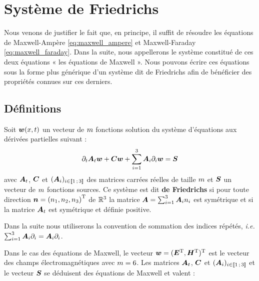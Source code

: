 \section{Système de Friedrichs}
\label{sect:systeme_de_friedrichs}

Nous venons de justifier le fait que, en principe, il suffit de résoudre
les équations de Maxwell-Ampère \eqref{eq:maxwell_ampere} et Maxwell-Faraday
\eqref{eq:maxwell_faraday}.
Dans la suite, nous appellerons le système constitué de ces deux équations
« les équations de Maxwell ». Nous pouvons écrire ces équations sous la forme
plus générique d'un système dit de Friedrichs \cite{friedrichs_definition, friedrichs_courant, friedrichs_ern} afin de bénéficier
des propriétés connues sur ces derniers.
\\

\subsection{Définitions}
\label{ssect:systeme_de_friedrichs_definitions}

\begin{definition} \label{def:friedrichs}
	Soit $\bm{w}(x,t)$ un vecteur
	de $m$ fonctions solution du système d'équations aux dérivées
	partielles suivant :
	\begin{align}
		\partial_{t} \bm{A}_{t} \bm{w} + \bm{C} \bm{w} + \sum_{i=1}^3 {\bm{A}_{i}\partial_{i}} \bm{w} = \bm{S}
		\label{eq:friedrichs}
	\end{align}
	avec $\bm{A}_{t}$, $\bm{C}$ et $(\bm{A}_{i})_{i \in \lbrack\!\lbrack1\,;\,3\rbrack\!\rbrack}$ des matrices carrées
	réelles de taille $m$ et $\bm{S}$ un vecteur de $m$ fonctions sources.
	Ce système est dit \textbf{de Friedrichs} si pour toute direction
	$\bm{n} = \left({n}_1,{n}_2,{n}_3\right)^{\mathrm{T}}$ de $\mathbb{R}^{3}$ la matrice $\bm{A} = \sum_{i=1}^3 {\bm{A}_{i}n_{i}}$ est symétrique
	et si la matrice $\bm{A}_{t}$ est symétrique et définie positive.
\end{definition}

\begin{notation}
	Dans la suite nous utiliserons la convention de sommation des indices répétés,
	\textit{i.e.} $\sum_{i=1}^3 {\bm{A}_{i}\partial_{i}} = {\bm{A}_{i}\partial_{i}}$.
\end{notation}

Dans le cas des équations de Maxwell, le vecteur
$\bm{w} = (\bm{E}^{\mathrm{T}},\bm{H}^{\mathrm{T}})^{\mathrm{T}}$
est le vecteur des champs électromagnétiques avec $m = 6$.
Les matrices $\bm{A}_{t}$, $\bm{C}$ et
$(\bm{A}_{i})_{i \in \lbrack\!\lbrack1\,;\,3\rbrack\!\rbrack}$ et le vecteur $\bm{S}$ se déduisent des
équations de Maxwell et valent :

